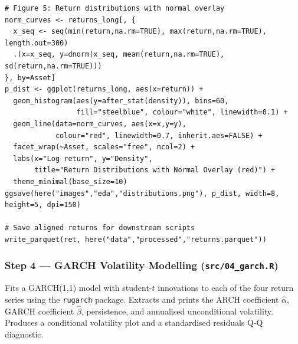 \begin{lstlisting}[style=Rstyle, caption={Step 3: EDA --- alignment, log returns, statistics, and plots}]
# Figure 5: Return distributions with normal overlay
norm_curves <- returns_long[, {
  x_seq <- seq(min(return,na.rm=TRUE), max(return,na.rm=TRUE), length.out=300)
  .(x=x_seq, y=dnorm(x_seq, mean(return,na.rm=TRUE), sd(return,na.rm=TRUE)))
}, by=Asset]
p_dist <- ggplot(returns_long, aes(x=return)) +
  geom_histogram(aes(y=after_stat(density)), bins=60,
                 fill="steelblue", colour="white", linewidth=0.1) +
  geom_line(data=norm_curves, aes(x=x,y=y),
            colour="red", linewidth=0.7, inherit.aes=FALSE) +
  facet_wrap(~Asset, scales="free", ncol=2) +
  labs(x="Log return", y="Density",
       title="Return Distributions with Normal Overlay (red)") +
  theme_minimal(base_size=10)
ggsave(here("images","eda","distributions.png"), p_dist, width=8, height=5, dpi=150)

# Save aligned returns for downstream scripts
write_parquet(ret, here("data","processed","returns.parquet"))
\end{lstlisting}

\subsubsection*{Step 4 --- GARCH Volatility Modelling (\texttt{src/04\_garch.R})}

Fits a GARCH(1,1) model with student-$t$ innovations to each of the four return
series using the \texttt{rugarch} package. Extracts and prints the ARCH
coefficient $\hat{\alpha}$, GARCH coefficient $\hat{\beta}$, persistence, and
annualised unconditional volatility. Produces a conditional volatility plot and
a standardised residuals Q-Q diagnostic.

